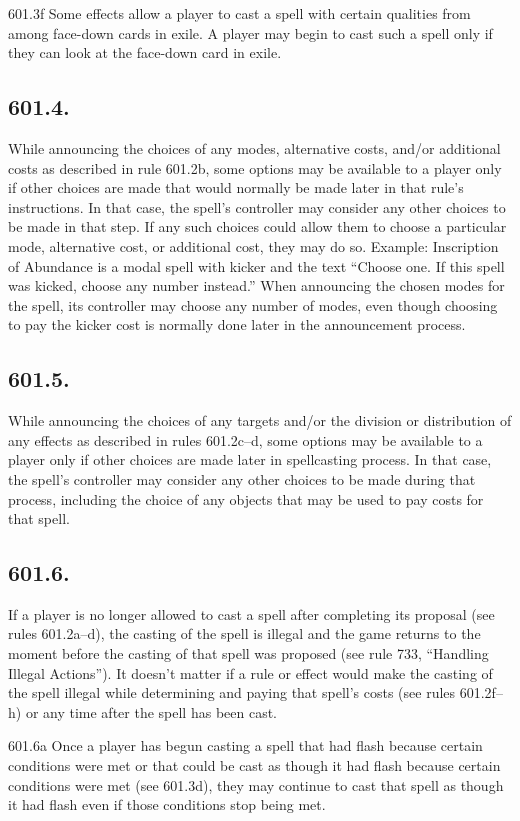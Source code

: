 601.3f Some effects allow a player to cast a spell with certain qualities from among face-down cards in exile. A player may begin to cast such a spell only if they can look at the face-down card in exile.

\subsection*{601.4.}
While announcing the choices of any modes, alternative costs, and/or additional costs as described in rule 601.2b, some options may be available to a player only if other choices are made that would normally be made later in that rule’s instructions. In that case, the spell’s controller may consider any other choices to be made in that step. If any such choices could allow them to choose a particular mode, alternative cost, or additional cost, they may do so.
Example: Inscription of Abundance is a modal spell with kicker and the text “Choose one. If this spell was kicked, choose any number instead.” When announcing the chosen modes for the spell, its controller may choose any number of modes, even though choosing to pay the kicker cost is normally done later in the announcement process.

\subsection*{601.5.}
While announcing the choices of any targets and/or the division or distribution of any effects as described in rules 601.2c–d, some options may be available to a player only if other choices are made later in spellcasting process. In that case, the spell’s controller may consider any other choices to be made during that process, including the choice of any objects that may be used to pay costs for that spell.

\subsection*{601.6.}
If a player is no longer allowed to cast a spell after completing its proposal (see rules 601.2a–d), the casting of the spell is illegal and the game returns to the moment before the casting of that spell was proposed (see rule 733, “Handling Illegal Actions”). It doesn’t matter if a rule or effect would make the casting of the spell illegal while determining and paying that spell’s costs (see rules 601.2f–h) or any time after the spell has been cast.

601.6a Once a player has begun casting a spell that had flash because certain conditions were met or that could be cast as though it had flash because certain conditions were met (see 601.3d), they may continue to cast that spell as though it had flash even if those conditions stop being met.


